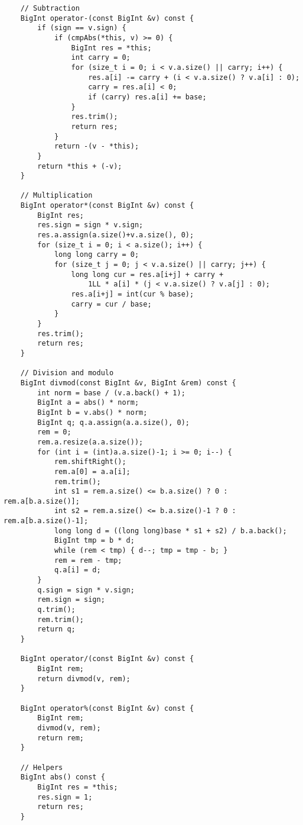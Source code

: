 \documentclass[11pt,a4paper]{article}
\begin{document}
\begin{multicols*}{2}
\begin{lstlisting}
    // Subtraction
    BigInt operator-(const BigInt &v) const {
        if (sign == v.sign) {
            if (cmpAbs(*this, v) >= 0) {
                BigInt res = *this;
                int carry = 0;
                for (size_t i = 0; i < v.a.size() || carry; i++) {
                    res.a[i] -= carry + (i < v.a.size() ? v.a[i] : 0);
                    carry = res.a[i] < 0;
                    if (carry) res.a[i] += base;
                }
                res.trim();
                return res;
            }
            return -(v - *this);
        }
        return *this + (-v);
    }

    // Multiplication
    BigInt operator*(const BigInt &v) const {
        BigInt res;
        res.sign = sign * v.sign;
        res.a.assign(a.size()+v.a.size(), 0);
        for (size_t i = 0; i < a.size(); i++) {
            long long carry = 0;
            for (size_t j = 0; j < v.a.size() || carry; j++) {
                long long cur = res.a[i+j] + carry +
                    1LL * a[i] * (j < v.a.size() ? v.a[j] : 0);
                res.a[i+j] = int(cur % base);
                carry = cur / base;
            }
        }
        res.trim();
        return res;
    }

    // Division and modulo
    BigInt divmod(const BigInt &v, BigInt &rem) const {
        int norm = base / (v.a.back() + 1);
        BigInt a = abs() * norm;
        BigInt b = v.abs() * norm;
        BigInt q; q.a.assign(a.a.size(), 0);
        rem = 0;
        rem.a.resize(a.a.size());
        for (int i = (int)a.a.size()-1; i >= 0; i--) {
            rem.shiftRight();
            rem.a[0] = a.a[i];
            rem.trim();
            int s1 = rem.a.size() <= b.a.size() ? 0 : rem.a[b.a.size()];
            int s2 = rem.a.size() <= b.a.size()-1 ? 0 : rem.a[b.a.size()-1];
            long long d = ((long long)base * s1 + s2) / b.a.back();
            BigInt tmp = b * d;
            while (rem < tmp) { d--; tmp = tmp - b; }
            rem = rem - tmp;
            q.a[i] = d;
        }
        q.sign = sign * v.sign;
        rem.sign = sign;
        q.trim();
        rem.trim();
        return q;
    }

    BigInt operator/(const BigInt &v) const {
        BigInt rem;
        return divmod(v, rem);
    }

    BigInt operator%(const BigInt &v) const {
        BigInt rem;
        divmod(v, rem);
        return rem;
    }

    // Helpers
    BigInt abs() const {
        BigInt res = *this;
        res.sign = 1;
        return res;
    }


\end{lstlisting}
\end{multicols*}
\end{document}
